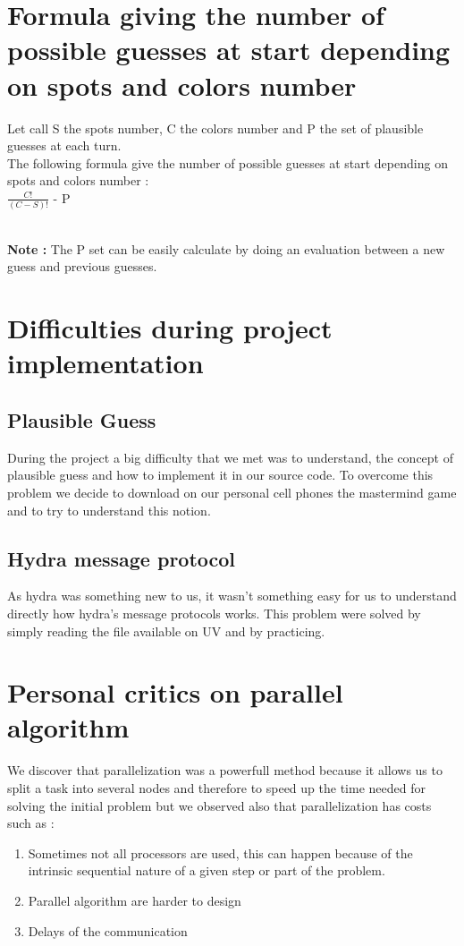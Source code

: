 \section{Formula giving the number of possible guesses at start depending on spots and 
colors number}
Let call S the spots number, C the colors number and P the set of plausible guesses at each turn. \\
The following formula give the number of possible guesses at start depending on spots and 
colors number : \\
$ \frac{C!}{(C-S)!}$ - P

\\
\textbf{Note :} The P set can be easily calculate by doing an evaluation between a new guess and previous guesses.

\section{Difficulties during project implementation}
\subsection{Plausible Guess}
During the project a big difficulty that we met was to understand, the concept of plausible guess and how to implement it in our source code.  To overcome this problem we decide to download on our personal cell phones the mastermind game and to try to understand this notion.
\subsection{Hydra message protocol}
As hydra was something new to us, it wasn't something easy for us to understand directly how hydra's message protocols works. This problem were solved by simply reading the file available on UV and by practicing. 


\section{Personal critics on parallel algorithm}
We discover that parallelization was a powerfull method because it allows us to split a task into several nodes and therefore to speed up the time needed for solving the initial problem but we observed also that parallelization has costs such as :
\begin{enumerate}
    \item Sometimes not all processors are used, this can happen because of the intrinsic sequential nature of a given step or part of the problem.
    \item Parallel algorithm are harder to design 
    \item Delays of the communication 
\end{enumerate}

